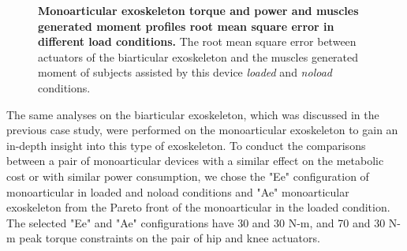 \documentclass[10pt,letterpaper]{article}
\begin{document}
\begin{figure}[ht!]
	\centering
	\hfil
	\vspace{1mm}
	\caption{\small{\textbf{Monoarticular exoskeleton torque and power and muscles generated moment profiles root mean square error in different load conditions.} The root mean square error between actuators of the biarticular exoskeleton and the muscles generated moment of subjects assisted by this device {\it loaded} and {\it noload} conditions.}}
	\label{Fig_Case04_RMSE}
\end{figure}
The same analyses on the biarticular exoskeleton, which was discussed in the previous case study,  were performed on the monoarticular exoskeleton to gain an in-depth insight into this type of exoskeleton. To conduct the comparisons between a pair of monoarticular devices with a similar effect on the metabolic cost or with similar power consumption, we chose the "Ee" configuration of monoarticular in loaded and noload conditions and "Ae" monoarticular exoskeleton from the Pareto front of the monoarticular in the loaded condition. The selected "Ee" and "Ae" configurations have 30 and 30 N-m, and 70 and 30 N-m peak torque constraints on the pair of hip and knee actuators.\\
\end{document}
